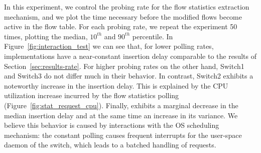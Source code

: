 In this experiment, we control the probing rate for the flow statistics 
extraction mechanism, and we plot the time necessary before the modified 
flows become active in the flow table. For each probing rate, we
repeat the experiment 50 times, plotting the median, $10^{th}$ and 
$90^{th}$ percentile. In Figure~\ref{fig:interaction_test} we can see
that, for lower polling rates, implementations have a near-constant
insertion delay comparable to the results of Section~\ref{sec:results-rate}.
For higher probing rates on the other hand, Switch1 and Switch3 do 
not differ much in their behavior. In contrast, Switch2 exhibits a noteworthy 
increase in the insertion delay. This is explained by the CPU utilization increase
incurred by the flow statistics polling (Figure~\ref{fig:stat_request_cpu}). Finally,
\ovs exhibits a marginal decrease in the median insertion delay
and at the same time an increase in its variance. We believe this behavior 
is caused by interactions with the OS scheduling mechanism: the constant 
polling causes frequent interrupts for the user-space daemon of the switch, 
which leads to a batched handling of requests.

